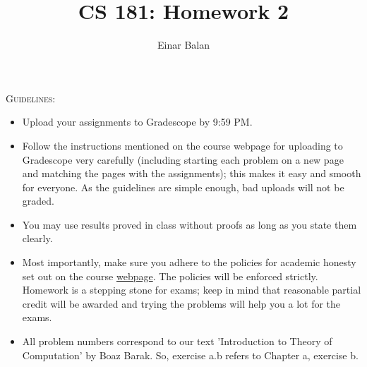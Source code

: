 \documentclass[11pt]{article}
\title{\bf{CS 181: Homework 2}}
\author{ Einar Balan}
\date{}
\begin{document}
\maketitle
\begin{mdframed}
\textsc{Guidelines}:
\begin{itemize}
\item Upload your assignments to Gradescope by 9:59 PM. 
\item Follow the instructions mentioned on the course webpage for uploading to Gradescope very carefully (including starting each problem on a new page and matching the pages with the assignments); this makes it easy and smooth for everyone. As the guidelines are simple enough, bad uploads will not be graded. 
\item You may use results proved in class without proofs as long as you state them clearly.
\item Most importantly, make sure you adhere to the policies for academic honesty set out on the course \href{https://hackmd.io/@raghum/introtcs}{webpage}. The policies will be enforced strictly. Homework is a stepping stone for exams; keep in mind that reasonable partial credit will be awarded and trying the problems will help you a lot for the exams.
\item All problem numbers correspond to our text 'Introduction to Theory of Computation' by Boaz Barak. So, exercise a.b refers to Chapter a, exercise b.
\end{itemize}
\end{mdframed}
\end{document}
